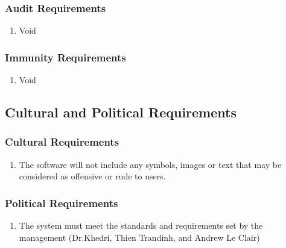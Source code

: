 \documentclass[]{article}
\begin{document}

\subsubsection{Audit Requirements}
\label{ssub:audit_requirements}

\begin{enumerate}[{SR}1. ]
	\item Void
\end{enumerate}


\subsubsection{Immunity Requirements}
\label{ssub:immunity_requirements}

\begin{enumerate}[{SR}1. ]
	\item Void
\end{enumerate}



\subsection{Cultural and Political Requirements}
\label{sub:cultural_and_political_requirements}

\subsubsection{Cultural Requirements}
\label{ssub:cultural_requirements}

\begin{enumerate}[{CP}1. ]
	\item The software will not include any symbols, images or text that may be considered as offensive or rude to users. 
\end{enumerate}


\subsubsection{Political Requirements}
\label{ssub:political_requirements}
\begin{enumerate}[{CP}1. ]
	\item The system must meet the standards and requirements set by the management (Dr.Khedri, Thien Trandinh, and Andrew Le Clair)
\end{enumerate}
\end{document}
